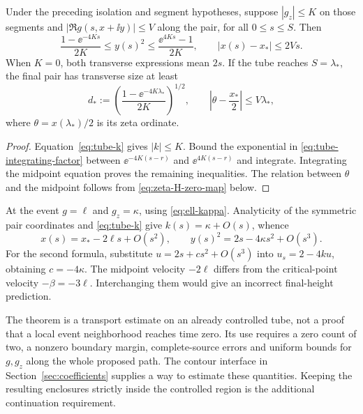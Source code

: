 \begin{theorem}\label{thm:tube}
Under the preceding isolation and segment hypotheses, suppose
\(|g_z|\le K\) on those segments and
\(|\Re g(s,x+\ii y)|\le V\) along the pair, for all \(0\le s\le S\).
Then
\begin{equation}\label{eq:tube-bounds}
 \frac{1-\ee^{-4Ks}}{2K}\le y(s)^2
 \le\frac{\ee^{4Ks}-1}{2K},\qquad
 |x(s)-x_*|\le2Vs.
\end{equation}
When \(K=0\), both transverse expressions mean \(2s\).
If the tube reaches \(S=\lambda_*\), the final pair has transverse
size at least
\begin{equation}\label{eq:final-tube-data}
 d_*:=\left(\frac{1-\ee^{-4K\lambda_*}}{2K}\right)^{1/2},
 \qquad \left|\theta-\frac{x_*}{2}\right|\le V\lambda_*,
\end{equation}
where \(\theta=x(\lambda_*)/2\) is its zeta ordinate.
\end{theorem}
\begin{proof}
Equation~\eqref{eq:tube-k} gives \(|k|\le K\). Bound the exponential
in \eqref{eq:tube-integrating-factor} between
\(\ee^{-4K(s-r)}\) and \(\ee^{4K(s-r)}\) and integrate.
Integrating the midpoint equation proves the remaining inequalities.
The relation between \(\theta\) and the midpoint follows from
\eqref{eq:zeta-H-zero-map} below.
\end{proof}

At the event \(g=\ell\) and \(g_z=\kappa\), using
\eqref{eq:ell-kappa}. Analyticity of the symmetric pair coordinates
and \eqref{eq:tube-k} give \(k(s)=\kappa+O(s)\), whence
\begin{equation}\label{eq:postcollision-jet}
 x(s)=x_*-2\ell s+O(s^2),\qquad
 y(s)^2=2s-4\kappa s^2+O(s^3).
\end{equation}
For the second formula, substitute \(u=2s+cs^2+O(s^3)\) into
\(u_s=2-4ku\), obtaining \(c=-4\kappa\).
The midpoint velocity \(-2\ell\) differs from the critical-point
velocity \(-\beta=-3\ell\). Interchanging them would give an
incorrect final-height prediction.

The theorem is a transport estimate on an already controlled tube,
not a proof that a local event neighborhood reaches time zero.
Its use requires a zero count of two, a nonzero boundary margin,
complete-source errors and uniform bounds for \(g,g_z\) along the
whole proposed path. The contour interface in
Section~\ref{sec:coefficients} supplies a way to estimate these
quantities. Keeping the resulting enclosures strictly inside the
controlled region is the additional continuation requirement.

